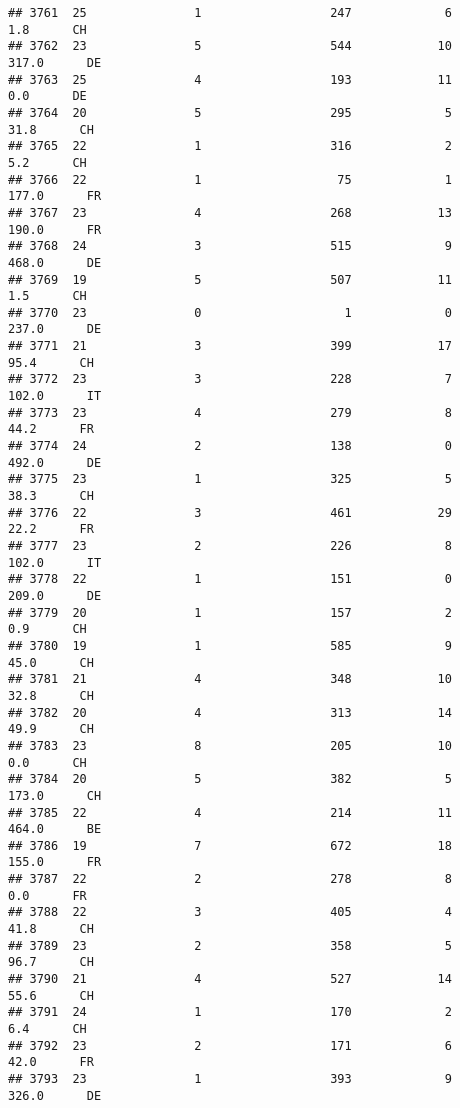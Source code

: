 \documentclass[
]{article}
\begin{document}
\begin{verbatim}
## 3761  25               1                  247             6      1.8      CH
## 3762  23               5                  544            10    317.0      DE
## 3763  25               4                  193            11      0.0      DE
## 3764  20               5                  295             5     31.8      CH
## 3765  22               1                  316             2      5.2      CH
## 3766  22               1                   75             1    177.0      FR
## 3767  23               4                  268            13    190.0      FR
## 3768  24               3                  515             9    468.0      DE
## 3769  19               5                  507            11      1.5      CH
## 3770  23               0                    1             0    237.0      DE
## 3771  21               3                  399            17     95.4      CH
## 3772  23               3                  228             7    102.0      IT
## 3773  23               4                  279             8     44.2      FR
## 3774  24               2                  138             0    492.0      DE
## 3775  23               1                  325             5     38.3      CH
## 3776  22               3                  461            29     22.2      FR
## 3777  23               2                  226             8    102.0      IT
## 3778  22               1                  151             0    209.0      DE
## 3779  20               1                  157             2      0.9      CH
## 3780  19               1                  585             9     45.0      CH
## 3781  21               4                  348            10     32.8      CH
## 3782  20               4                  313            14     49.9      CH
## 3783  23               8                  205            10      0.0      CH
## 3784  20               5                  382             5    173.0      CH
## 3785  22               4                  214            11    464.0      BE
## 3786  19               7                  672            18    155.0      FR
## 3787  22               2                  278             8      0.0      FR
## 3788  22               3                  405             4     41.8      CH
## 3789  23               2                  358             5     96.7      CH
## 3790  21               4                  527            14     55.6      CH
## 3791  24               1                  170             2      6.4      CH
## 3792  23               2                  171             6     42.0      FR
## 3793  23               1                  393             9    326.0      DE

\end{verbatim}
\end{document}
